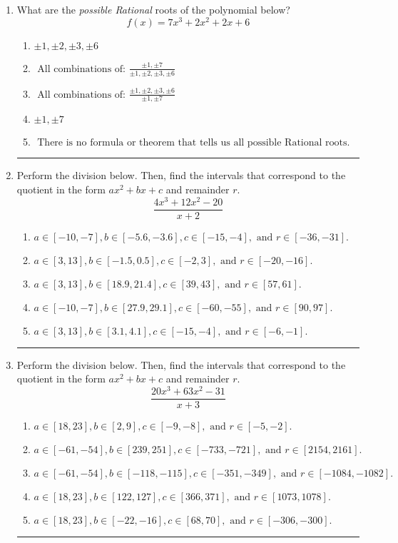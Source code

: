 \documentclass[14pt]{extbook}
\newcommand{\litem}[1]{\item#1\hspace*{-1cm}\rule{\textwidth}{0.4pt}}
\begin{document}
\begin{enumerate}
{\begin{enumerate}[label=\Alph*.]
\end{enumerate} }
\litem{
What are the \textit{possible Rational} roots of the polynomial below?\[ f(x) = 7x^{3} +2 x^{2} +2 x + 6 \]\begin{enumerate}[label=\Alph*.]
\item \( \pm 1,\pm 2,\pm 3,\pm 6 \)
\item \( \text{ All combinations of: }\frac{\pm 1,\pm 7}{\pm 1,\pm 2,\pm 3,\pm 6} \)
\item \( \text{ All combinations of: }\frac{\pm 1,\pm 2,\pm 3,\pm 6}{\pm 1,\pm 7} \)
\item \( \pm 1,\pm 7 \)
\item \( \text{ There is no formula or theorem that tells us all possible Rational roots.} \)

\end{enumerate} }
\litem{
Perform the division below. Then, find the intervals that correspond to the quotient in the form $ax^2+bx+c$ and remainder $r$.\[ \frac{4x^{3} +12 x^{2} -20}{x + 2} \]\begin{enumerate}[label=\Alph*.]
\item \( a \in [-10, -7], b \in [-5.6, -3.6], c \in [-15, -4], \text{ and } r \in [-36, -31]. \)
\item \( a \in [3, 13], b \in [-1.5, 0.5], c \in [-2, 3], \text{ and } r \in [-20, -16]. \)
\item \( a \in [3, 13], b \in [18.9, 21.4], c \in [39, 43], \text{ and } r \in [57, 61]. \)
\item \( a \in [-10, -7], b \in [27.9, 29.1], c \in [-60, -55], \text{ and } r \in [90, 97]. \)
\item \( a \in [3, 13], b \in [3.1, 4.1], c \in [-15, -4], \text{ and } r \in [-6, -1]. \)

\end{enumerate} }
\litem{
Perform the division below. Then, find the intervals that correspond to the quotient in the form $ax^2+bx+c$ and remainder $r$.\[ \frac{20x^{3} +63 x^{2} -31}{x + 3} \]\begin{enumerate}[label=\Alph*.]
\item \( a \in [18, 23], b \in [2, 9], c \in [-9, -8], \text{ and } r \in [-5, -2]. \)
\item \( a \in [-61, -54], b \in [239, 251], c \in [-733, -721], \text{ and } r \in [2154, 2161]. \)
\item \( a \in [-61, -54], b \in [-118, -115], c \in [-351, -349], \text{ and } r \in [-1084, -1082]. \)
\item \( a \in [18, 23], b \in [122, 127], c \in [366, 371], \text{ and } r \in [1073, 1078]. \)
\item \( a \in [18, 23], b \in [-22, -16], c \in [68, 70], \text{ and } r \in [-306, -300]. \)

\end{enumerate} }
\end{enumerate}
\end{document}
